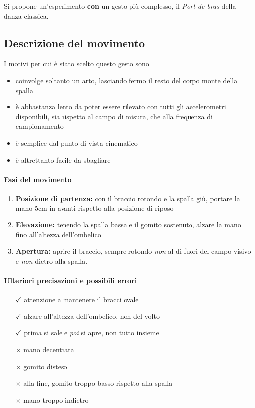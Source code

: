 Si propone un'esperimento \textbf{con} un gesto più complesso, il \textit{Port de bras} della danza classica.

\subsection{Descrizione del movimento}
I motivi per cui è stato scelto questo gesto sono  
\begin{itemize}
	\item coinvolge soltanto un arto, lasciando fermo il resto del corpo monte della spalla
    \item è abbastanza lento da poter essere rilevato con tutti gli accelerometri disponibili, sia rispetto al campo di misura, che alla frequenza di campionamento
    \item è semplice dal punto di vista cinematico
    \item è altrettanto facile da sbagliare
\end{itemize}

\paragraph{Fasi del movimento}
\begin{enumerate}
	\item \textbf{Posizione di partenza:} con il braccio rotondo e la spalla giù, portare la mano 5cm in avanti rispetto alla posizione di riposo
    \item \textbf{Elevazione:} tenendo la spalla bassa e il gomito sostenuto, alzare la mano fino all'altezza dell'ombelico
    \item \textbf{Apertura:} aprire il braccio, sempre rotondo \emph{non} al di fuori del campo visivo e \emph{non} dietro alla spalla.
\end{enumerate}

\paragraph{Ulteriori precisazioni e possibili errori}
\begin{itemize}
    \item [$\checkmark$] attenzione a mantenere il bracci ovale
    \item [$\checkmark$] alzare all'altezza dell'ombelico, non del volto
    \item [$\checkmark$] prima si sale e \emph{poi} si apre, non tutto insieme
	\item[$\times$] mano decentrata
   	\item[$\times$] gomito disteso
	\item[$\times$] alla fine, gomito troppo basso rispetto alla spalla
   	\item[$\times$] mano troppo indietro
\end{itemize}






